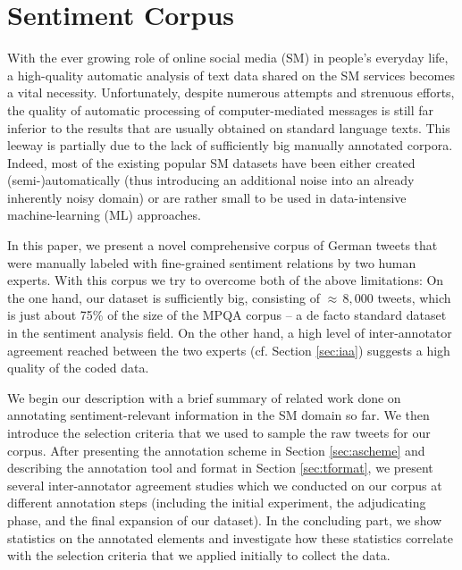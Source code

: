 

\section{Sentiment Corpus}\label{sec:corpus}

With the ever growing role of online social media (SM) in people's
everyday life, a high-quality automatic analysis of text data shared
on the SM services becomes a vital necessity.  Unfortunately, despite
numerous attempts and strenuous efforts, the quality of automatic
processing of computer-mediated messages is still far inferior to the
results that are usually obtained on standard language texts.  This
leeway is partially due to the lack of sufficiently big manually
annotated corpora.  Indeed, most of the existing popular SM datasets
\cite{Go:09,Pak:10} have been either created (semi-)automatically
(thus introducing an additional noise into an already inherently noisy
domain) or are rather small to be used in data-intensive
machine-learning (ML) approaches.

In this paper, we present a novel comprehensive corpus of German
tweets that were manually labeled with fine-grained sentiment
relations by two human experts.  With this corpus we try to overcome
both of the above limitations: On the one hand, our dataset is
sufficiently big, consisting of ${\approx}\,8,000$ tweets, which is
just about 75\% of the size of the MPQA corpus \cite{Wiebe:05a} -- a
de facto standard dataset in the sentiment analysis field.  On the
other hand, a high level of inter-annotator agreement reached between
the two experts (cf. Section \ref{sec:iaa}) suggests a high quality of
the coded data.

We begin our description with a brief summary of related work done on
annotating sentiment-relevant information in the SM domain so far.  We
then introduce the selection criteria that we used to sample the raw
tweets for our corpus.  After presenting the annotation scheme in
Section \ref{sec:ascheme} and describing the annotation tool and
format in Section \ref{sec:tformat}, we present several
inter-annotator agreement studies which we conducted on our corpus at
different annotation steps (including the initial experiment, the
adjudicating phase, and the final expansion of our dataset).  In the
concluding part, we show statistics on the annotated elements and
investigate how these statistics correlate with the selection criteria
that we applied initially to collect the data.

